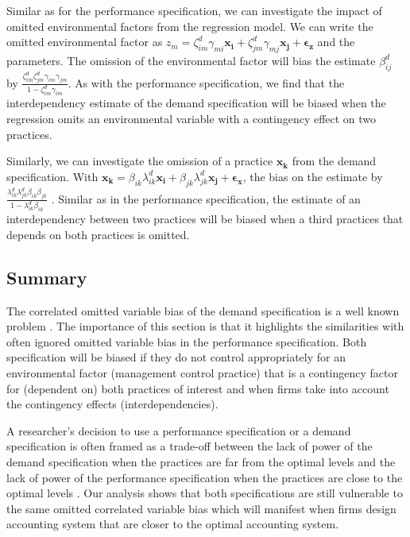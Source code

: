 \documentclass[12pt]{article}
\begin{document}
Similar as for the performance specification, we can investigate the impact of omitted environmental factors from the regression model. We can write the omitted environmental factor as $z_m = \zeta_{im}^d \gamma_{mi} \mathbf{x_i} +  \zeta_{jm}^d \gamma_{mj} \mathbf{x_j} + \mathbf{\epsilon_z}$ and the parameters. The omission of the environmental factor will bias the estimate $\beta^d_{ij}$ by $\frac{\zeta^d_{im} \zeta^d_ {jm}\gamma_{im} \gamma_{jm}}{1 - \zeta^d_{im} \gamma_{im}}$. As with the performance specification, we find that the interdependency estimate of the demand specification will be biased when the regression omits an environmental variable with a contingency effect on two practices.

Similarly, we can investigate the omission of a practice $\mathbf{x_k}$ from the demand specification. With $\mathbf{x_k} = \beta_{ik} \lambda^d_{ik} \mathbf{x_i} + \beta_{jk} \lambda^d_{jk} \mathbf{x_j} + \mathbf{\epsilon_x}$, the bias on the estimate by $\frac{\lambda^d_{ik} \lambda^d_{jk} \beta_{ik} \beta_{jk}}{1 - \lambda^d_{ik} \beta_{ik}}$ . Similar as in the performance specification, the estimate of an interdependency between two practices will be biased when a third practices that depends on both practices is omitted. 

\subsection{Summary}

The correlated omitted variable bias of the demand specification is a well known problem \citep{Grabner2013,Arora1996,Carree2011}. The importance of this section is that it highlights the similarities with often ignored omitted variable bias in the performance specification. Both specification will be biased if they do not control appropriately for an environmental factor (management control practice) that is a contingency factor for (dependent on) both practices of interest and when firms take into account the contingency effects (interdependencies).

A researcher's decision to use a performance specification or a demand specification is often framed as a trade-off between the lack of power of the demand specification when the practices are far from the optimal levels and the lack of power of the performance specification when the practices are close to the optimal levels \citep{Grabner2013,Aral2012}. Our analysis shows that both specifications are still vulnerable to the same omitted correlated variable bias which will manifest when firms design accounting system that are closer to the optimal accounting system.
\end{document}

